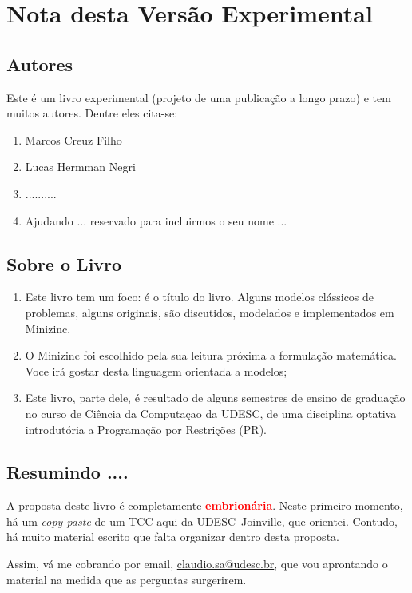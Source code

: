 
\chapter*{Nota desta Versão Experimental}


\section*{Autores}

Este é um livro experimental (projeto de uma publicação a longo prazo) e tem muitos autores. Dentre eles cita-se:

\begin{enumerate}
\item Marcos Creuz Filho
\item Lucas Hermman Negri
\item ..........
\item Ajudando ... reservado para incluirmos o seu nome  ...

\end{enumerate}


\section*{Sobre o Livro}

\begin{enumerate}
\item Este livro tem um foco: é o título do livro. Alguns modelos
clássicos de problemas, alguns originais, 
são discutidos, modelados e implementados em Minizinc.

\item O Minizinc foi escolhido pela sua leitura próxima a formulação
matemática. Voce irá gostar desta linguagem orientada a modelos;


\item Este livro, parte dele, é resultado de alguns semestres de ensino de graduação no curso de Ciência da Computaçao da UDESC, de uma disciplina optativa introdutória
a Programação por Restrições (PR).


\end{enumerate}


\section*{Resumindo ....}

A proposta deste livro é completamente {\bf \textcolor{red}{embrionária}}.  Neste primeiro
momento, há um {\em copy-paste} de um TCC aqui da UDESC--Joinville, que orientei. Contudo, há  muito material escrito
que falta organizar dentro desta proposta.

Assim, vá me cobrando por email, \url{claudio.sa@udesc.br},
que vou aprontando o material na medida que as perguntas surgerirem.
